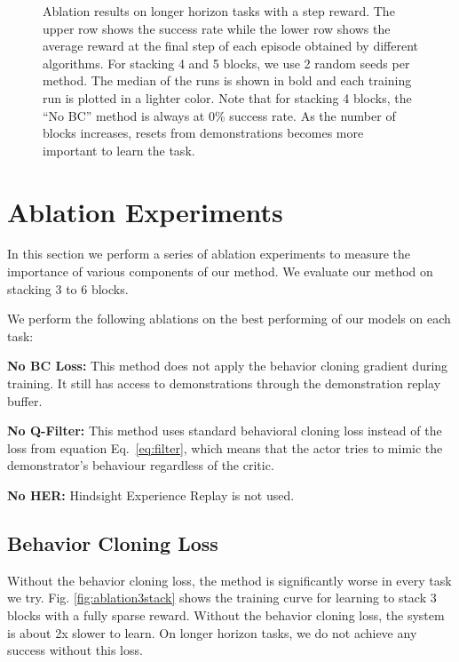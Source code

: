 \begin{figure}[t]
    \caption{Ablation results on longer horizon tasks with a step reward. The upper row shows the success rate while the lower row shows the  average reward at the final step of each episode obtained by different algorithms. For stacking 4 and 5 blocks, we use 2 random seeds per method. The median of the runs is shown in bold and each training run is plotted in a lighter color. Note that for stacking 4 blocks, the ``No BC'' method is always at 0\% success rate. As the number of blocks increases, resets from demonstrations becomes more important to learn the task. }%
    \label{fig:step1}%
\end{figure}

\section{Ablation Experiments}
\label{sec:ablations}

In this section we perform a series of ablation experiments to measure the importance of various components of our method. We evaluate our method on stacking 3 to 6 blocks.

We perform the following ablations on the best performing of our models on each task:

\noindent \textbf{No BC Loss:} This method does not apply the behavior cloning gradient during training. It still has access to demonstrations through the demonstration replay buffer.

\noindent \textbf{No Q-Filter:} This method uses standard behavioral cloning loss instead of the loss from equation Eq.~\ref{eq:filter}, which means that the actor tries to mimic the demonstrator's behaviour
regardless of the critic.

\noindent \textbf{No HER:} Hindsight Experience Replay is not used.

\subsection{Behavior Cloning Loss}

Without the behavior cloning loss, the method is significantly worse in every task we try. Fig. \ref{fig:ablation3stack} shows the training curve for learning to stack 3 blocks with a fully sparse reward. Without the behavior cloning loss, the system is about 2x slower to learn. On longer horizon tasks, we do not achieve any success without this loss.

